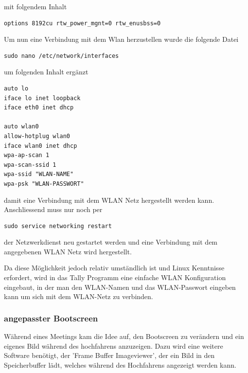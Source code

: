 \documentclass[11pt,a4paper]{article} %
\begin{document}
mit folgendem Inhalt
\begin{frame}

\begin{lstlisting}
options 8192cu rtw_power_mgnt=0 rtw_enusbss=0
\end{lstlisting}

\end{frame}
\par
\par
Um nun eine Verbindung mit dem Wlan herzustellen wurde die folgende Datei
\begin{frame}

\begin{lstlisting}
sudo nano /etc/network/interfaces
\end{lstlisting}

\end{frame}

um folgenden Inhalt ergänzt
\begin{frame}

\begin{lstlisting}
auto lo
iface lo inet loopback
iface eth0 inet dhcp

auto wlan0
allow-hotplug wlan0
iface wlan0 inet dhcp
wpa-ap-scan 1
wpa-scan-ssid 1
wpa-ssid "WLAN-NAME"
wpa-psk "WLAN-PASSWORT"

\end{lstlisting}

\end{frame}

damit eine Verbindung mit dem WLAN Netz hergestellt werden kann.
Anschliessend muss nur noch per
\begin{frame}

\begin{lstlisting}
sudo service networking restart
\end{lstlisting}

\end{frame}
der Netzwerkdienst neu gestartet werden und eine Verbindung mit dem angegebenen WLAN Netz wird hergestellt.
\par
Da diese Möglichkeit jedoch relativ umständlich ist und Linux Kenntnisse erfordert, wird in das Tally Programm eine einfache WLAN Konfiguration eingebaut, in der man den WLAN-Namen und das WLAN-Passwort eingeben kann um sich mit dem WLAN-Netz zu verbinden.

\subsubsection{angepasster Bootscreen}
Während eines Meetings kam die Idee auf, den Bootscreen zu verändern und ein eigenes Bild während des hochfahrens anzuzeigen. Dazu wird eine weitere Software benötigt, der 'Frame Buffer Imageviewer', der ein Bild in den Speicherbuffer lädt, welches während des Hochfahrens angezeigt werden kann. \cite{9}
\end{document}
